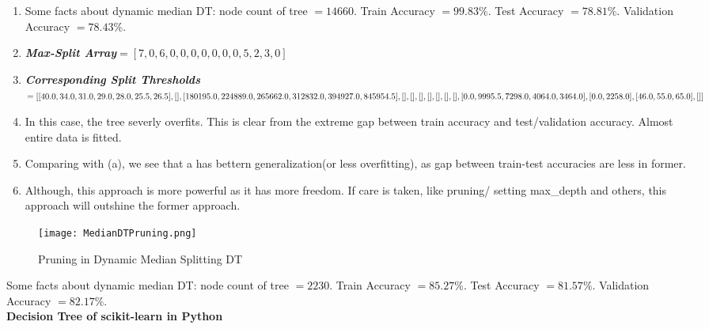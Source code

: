 \documentclass{article}
\newcommand{\bld}[1]{\textbf{#1}}
\newcommand{\italb}[1]{\textbf{\textit{#1}}}
\begin{document}
\begin{enumerate}
	\item Some facts about dynamic median DT: node count of tree $= 14660$. Train Accuracy $=99.83\%$. Test Accuracy $=78.81\%$. Validation Accuracy $=78.43\%$.
	\item \italb{Max-Split Array}$=[7, 0, 6, 0, 0, 0, 0, 0, 0, 0, 5, 2, 3, 0]$
	\item \italb{Corresponding Split Thresholds}$=[[40.0, 34.0, 31.0, 29.0, 28.0, 25.5, 26.5], [], [180195.0, 224889.0, 265662.0, \\ 312832.0, 394927.0, 845954.5], [], [], [], [], [], [], [], [0.0, 9995.5, 7298.0, 4064.0, 3464.0], [0.0, 2258.0], [46.0, 55.0, 65.0], []]$
	\item In this case, the tree severly overfits. This is clear from the extreme gap between train accuracy and test/validation accuracy. Almost entire data is fitted.
	\item Comparing with (a), we see that a has bettern generalization(or less overfitting), as gap between train-test accuracies are less in former.
	\item Although, this approach is more powerful as it has more freedom. If care is taken, like pruning/ setting max\_depth and others, this approach will outshine the former approach.
\end{enumerate}
\begin{figure}[h]
\vspace*{-3cm}
\hspace*{-1.5cm}
\centering
\texttt{[image: MedianDTPruning.png]}
\vspace*{-1.5cm}
\caption{Pruning in Dynamic Median Splitting DT}
\end{figure}
Some facts about dynamic median DT: node count of tree $= 2230$. Train Accuracy $=85.27\%$. Test Accuracy $=81.57\%$. Validation Accuracy $=82.17\%$.
\\ 

\bld{Decision Tree of scikit-learn in Python}
\end{document}
